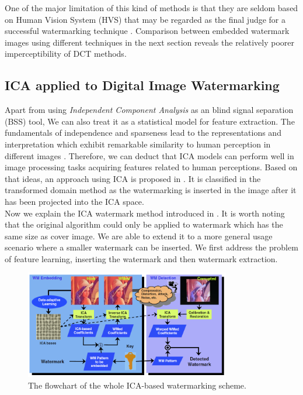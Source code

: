 One of the major limitation of this kind of methods is that they are seldom based on Human Vision System (HVS) that may be regarded as the final judge for a successful watermarking technique \cite{LuWei_ICA}. Comparison between embedded watermark images using different techniques in the next section reveals the relatively poorer imperceptibility of DCT methods.

\subsection{ICA applied to Digital Image Watermarking}
Apart from using \textit{Independent Component Analysis} as an blind signal separation (BSS) tool, We can also treat it as a statistical model for feature extraction. The fundamentals of independence and sparseness lead to the representations and interpretation which exhibit remarkable similarity to human perception in different images \cite{BELL19973327}. Therefore, we can deduct that ICA
models can perform well in image processing tasks acquiring features related to human perceptions. Based on that ideas, an approach using ICA is proposed in \cite{inproceedingsICA_watermark}. It is classified in the transformed domain method as the watermarking is inserted in the image after it has been projected into the ICA space. \\

Now we explain the ICA watermark method introduced in \cite{inproceedingsICA_watermark}. It is worth noting that the original algorithm could only be applied to watermark which has the same size as cover image. We are able to extend it to a more general usage scenario where a smaller watermark can be inserted. We first address the problem of feature learning, inserting the watermark and then watermark extraction.

\begin{figure}[H]
\centering
\includegraphics[width=0.8\textwidth]{images/ICA_flowchart.PNG}
\caption{The flowchart of the whole ICA-based watermarking scheme. \cite{LuWei_ICA}}
\label{flow_ICA}
\end{figure}



